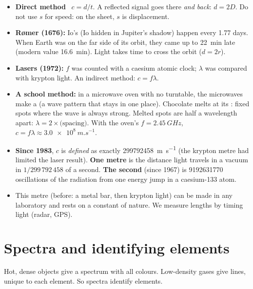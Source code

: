 \begin{itemize}
  \item \textbf{Direct method} \hscbadgenotonsheet\ $c = d/t$. A reflected signal goes there
        \emph{and back}: $d = 2D$. Do not use $s$ for speed: on the sheet, $s$ is
        displacement.
  \item \textbf{Rømer (1676):} Io's  (Io hidden in Jupiter's shadow) happen
        every 1.77 days. When Earth was on the far side of its orbit, they came up to
        \qty{22}{min} late (modern value \qty{16.6}{min}). Light takes time to cross the orbit
        ($d = 2r$).
  \item \textbf{Lasers (1972):} $f$ was counted with a caesium atomic clock; $\lambda$ was
        compared with krypton light. An indirect method: $c = f\lambda$.
  \item \textbf{A school method:} in a microwave oven with no turntable, the microwaves make a
         (a wave pattern that stays in one place). Chocolate melts at its
        : fixed spots where the wave is always strong. Melted spots are half a
        wavelength apart: $\lambda = 2\times\text{(spacing)}$. With the oven's
        $f = \qty{2.45}{GHz}$, $c = f\lambda \approx \qty{3.0e8}{m.s^{-1}}$.
  \item \textbf{Since 1983}, $c$ is \emph{defined} as exactly \qty{299792458}{m.s^{-1}} (the
        krypton metre had limited the laser result).
        \textbf{One metre} is the distance light travels in a vacuum in $1/299\,792\,458$ of a
        second. \textbf{The second} (since 1967) is \num{9192631770} oscillations of the
        radiation from one energy jump in a caesium-133 atom.
  \item This metre (before: a metal bar, then krypton light) can be made in any laboratory and
        rests on a constant of nature. We measure lengths by timing light (radar, GPS).
\end{itemize}



\section{Spectra and identifying elements}\label{ch1:sec:spectra}

\begin{bigidea}
Hot, dense objects give a spectrum with all colours. Low-density gases give lines, unique to
each element. So spectra identify elements.
\end{bigidea}

